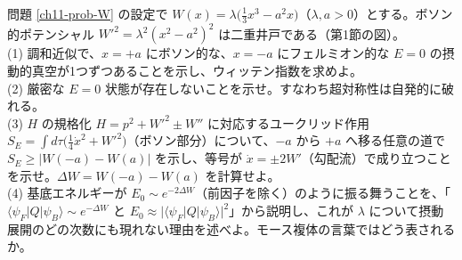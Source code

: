 \begin{problem}[難易度 C]\label{ch11-prob-dw}
問題 \ref{ch11-prob-W} の設定で $W(x)=\lambda\bigl(\tfrac13x^3-a^2x\bigr)$（$\lambda,a>0$）とする。ボソン的ポテンシャル $W'^2=\lambda^2(x^2-a^2)^2$ は二重井戸である（第1節の図）。\\
(1) 調和近似で、$x=+a$ にボソン的な、$x=-a$ にフェルミオン的な $E=0$ の摂動的真空が1つずつあることを示し、ウィッテン指数を求めよ。\\
(2) 厳密な $E=0$ 状態が存在しないことを示せ。すなわち超対称性は自発的に破れる。\\
(3) $H$ の規格化 $H=p^2+W'^2\pm W''$ に対応するユークリッド作用 $S_E=\int d\tau\bigl(\tfrac14\dot x^2+W'^2\bigr)$（ボソン部分）について、$-a$ から $+a$ へ移る任意の道で $S_E\ge\lvert W(-a)-W(a)\rvert$ を示し、等号が $\dot x=\pm2W'$（勾配流）で成り立つことを示せ。$\Delta W=W(-a)-W(a)$ を計算せよ。\\
(4) 基底エネルギーが $E_0\sim e^{-2\Delta W}$（前因子を除く）のように振る舞うことを、「$\langle\psi_F\lvert Q\rvert\psi_B\rangle\sim e^{-\Delta W}$ と $E_0\approx\lvert\langle\psi_F|Q|\psi_B\rangle\rvert^2$」から説明し、これが $\lambda$ について摂動展開のどの次数にも現れない理由を述べよ。モース複体の言葉ではどう表されるか。
\end{problem}

